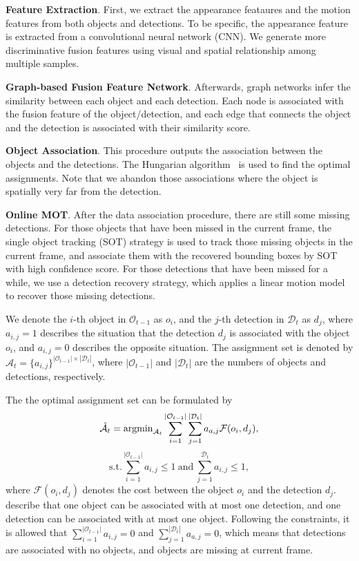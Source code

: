\documentclass[10pt,twocolumn,letterpaper]{article}
\begin{document}
\textbf{Feature Extraction}.
First, we extract the appearance feataures and the motion features from both objects and detections. 
To be specific, the appearance feature is extracted from a convolutional neural network (CNN).
We generate more discriminative fusion features using visual and spatial relationship among multiple samples.

\textbf{Graph-based Fusion Feature Network}.
Afterwards, graph networks infer the similarity between each object and each detection. 
Each node is associated with the fusion feature of the object/detection,
and each edge that connects the object and the detection is associated with their similarity score.

\textbf{Object Association}.
This procedure outputs the association between the objects and the detections.
The Hungarian algorithm~\cite{kuhn1955hungarian} is used to find the optimal assignments.
Note that we abandon those associations where the object is spatially very far from the detection.

\textbf{Online MOT}.
After the data association procedure, there are still some missing detections.
For those objects that have been missed in the current frame, the single object tracking (SOT) strategy is used to track those missing objects in the current frame,
and associate them with the recovered bounding boxes by SOT with high confidence score.
For those detections that have been missed for a while, we use a detection recovery strategy, which applies a linear motion model to recover those missing detections.

We denote the $i$-th object in $\mathcal{O}_{t-1}$ as $o_i$, 
and the $j$-th detection in $\mathcal{D}_t$ as $d_j$, 
where $a_{i,j}=1$ describes the situation that the detection $d_j$ is associated with the object $o_i$,
and $a_{i,j}=0$ describes the opposite situation.
The assignment set is denoted by $\mathcal{A}_t=\{ a_{i,j} \} ^ {|\mathcal{O}_{t-1}| \times |\mathcal{D}_t| }$, where $| \mathcal{O}_{t-1} |$ and $|\mathcal{D}_t|$ are the numbers of objects and detections, respectively.

The the optimal assignment set can be formulated by 
\begin{equation}
\hat{ \mathcal{A} }_t = 
{\rm argmin}_{\mathcal{A}_t}
\sum_{i=1}^{|\mathcal{O}_{t-1}|}
\sum_{j=1}^{|\mathcal{D}_t|}
a_{a,j}
\mathcal{F} (o_i, d_j),
\end{equation}
\begin{equation} \label{equ:association_constraint}
\mathrm{s.t.}
\sum_{i=1}^{|\mathcal{O}_{t-1}|}
a_{i,j} \leq 1
\ \mathrm{and} \ 
\sum_{j=1}^{\mathcal{D}_t}
a_{i,j} \leq 1,
\end{equation}
where $\mathcal{F}(o_i,d_j)$ denotes the cost between the object $o_i$ and the detection $d_j$.
\Cref{equ:association_constraint} describe that one object can be associated with at most one detection, 
and one detection can be associated with at most one object.
Following the constraints, it is allowed that $\sum_{i=1}^{|\mathcal{O}_{t-1}|} a_{i,j} = 0$ and $ \sum_{j=1}^{|\mathcal{D}_t|} a_{a,j} = 0 $,
which means that detections are associated with no objects,
and objects are missing at current frame.
\end{document}
